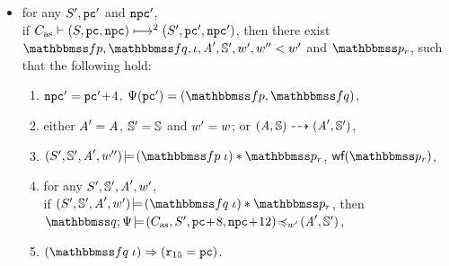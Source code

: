 \begin{definition}
\begin{enumerate}[1.]
\begin{itemize}
                \item for any $\state', \pc'$ and $\npc'$, \\ 
                if
                $\multilptrans{\asmimp}{2}{(\state, \pc, \npc)}{(\state', \pc', \npc')}$,
                then there exist $\relspecpre, \relspecpost, \lgvl, 
                \primcom', \hpstate', \word', \word'' < \word'$ 
                and $\relastP_r$, such that the following hold:
                \begin{enumerate}[(1)]
                    \item $\npc' = \pc'\!+\!4$,
                        $\Cspec(\pc') = (\relspecpre, \relspecpost)$,
                    
                    \item either $\primcom' = \primcom$, 
                    $\hpstate' = \hpstate$ and $\word' = \word$; 
                    or 
                    $\primTrans{(\primcom, \hpstate)}
                        {(\primcom', \hpstate')}$,
                    
                    \item 
                        $\asrtmodel{(\state', \hpstate', \primcom', \word'')}
                            {(\relspecpre \; \lgvl) * \relastP_r}$, 
                        $\wfFrm(\relastP_r)$, 
                    
                    \item
                    for any $\state', \hpstate', \primcom', \word'$, \\ 
                    if $\asrtmodel{(\state', \hpstate', \primcom', \word')}
                        {(\relspecpost \; \lgvl) * \relastP_r}$,
                    then \\ 
                    $\simInsSeq{\relastQ}{\Cspec}{(\asmimp, \state', \pc\!+\!8, \npc\!+\!12)}
                        {\word'}{(\primcom', \hpstate')}$,
                    
                    \item
                    $(\relspecpost \; \lgvl) 
                    \Rightarrow (\reg{15} = \pc)$. 
                \end{enumerate}
            \end{itemize}


\end{enumerate}
\end{definition}
